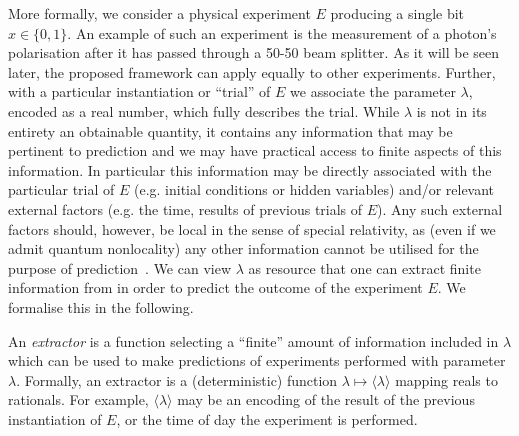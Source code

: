 \documentclass[%
 superscriptaddress,
 preprint,
 showpacs,
 showkeys,
 preprintnumbers,
  amsmath,amssymb,
  aps,
 pra,
  longbibliography,
  floatfix,
 ]{revtex4-1}
\theoremstyle{definition}
\begin{document}
More formally, we consider a physical experiment $E$ producing a single bit $x\in\{0,1\}$.
An example of such an experiment is the measurement of a photon's polarisation after it has passed through a 50-50 beam splitter.  As it will be  seen later, the proposed framework can apply equally to other experiments.
Further, with a particular instantiation or ``trial'' of $E$ we associate the parameter $\lambda$, encoded as a real number,  which fully describes the trial.
While $\lambda$ is not in its entirety an obtainable quantity, it contains any information that may be pertinent to prediction and we may have practical access to finite aspects of this information.
In particular this information may be   directly associated with the particular trial of $E$ (e.g. initial conditions or hidden variables) %
and/or relevant external factors (e.g. the time, results of previous trials of $E$).
Any such external factors should, however, be local in the sense of special relativity, as (even if we admit quantum nonlocality) any other information cannot be utilised for the purpose of prediction~\cite{laloe-2012}.
We can view $\lambda$ as resource that one can extract finite information from in order   to predict the outcome of the experiment $E$.
We formalise this in the following.

An {\em extractor} is a function selecting a ``finite'' amount of information included in $\lambda$
which can be used to make predictions of experiments performed with parameter $\lambda$. Formally, an extractor is a (deterministic)
function $\lambda \mapsto \langle \lambda \rangle$ mapping reals to rationals.
For example, $\langle \lambda \rangle$ may be an encoding of the result of the previous instantiation of $E$, or the time of day the experiment is performed.
\end{document}

